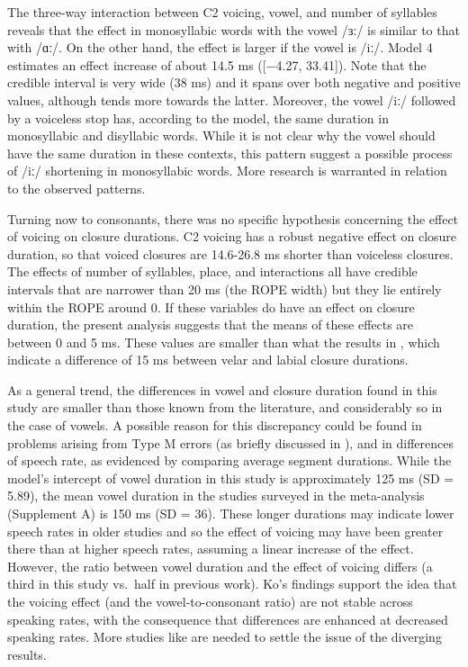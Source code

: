 \documentclass[
  12pt,
  a4paper,
]{article}
\begin{document}
The three-way interaction between C2 voicing, vowel, and number of
syllables reveals that the effect in monosyllabic words with the vowel
/ɜː/ is similar to that with /ɑː/. On the other hand, the effect is
larger if the vowel is /iː/. Model 4 estimates an effect increase of
about 14.5 ms ({[}−4.27, 33.41{]}). Note that the credible interval is
very wide (38 ms) and it spans over both negative and positive values,
although tends more towards the latter. Moreover, the vowel /iː/
followed by a voiceless stop has, according to the model, the same
duration in monosyllabic and disyllabic words. While it is not clear why
the vowel should have the same duration in these contexts, this pattern
suggest a possible process of /iː/ shortening in monosyllabic words.
More research is warranted in relation to the observed patterns.

Turning now to consonants, there was no specific hypothesis concerning
the effect of voicing on closure durations. C2 voicing has a robust
negative effect on closure duration, so that voiced closures are
14.6-26.8 ms shorter than voiceless closures. The effects of number of
syllables, place, and interactions all have credible intervals that are
narrower than 20 ms (the ROPE width) but they lie entirely within the
ROPE around 0. If these variables do have an effect on closure duration,
the present analysis suggests that the means of these effects are
between 0 and 5 ms. These values are smaller than what the results in
\citet{sharf1962}, which indicate a difference of 15 ms between velar
and labial closure durations.

As a general trend, the differences in vowel and closure duration found
in this study are smaller than those known from the literature, and
considerably so in the case of vowels. A possible reason for this
discrepancy could be found in problems arising from Type M errors (as
briefly discussed in ), and in differences of speech rate,
as evidenced by comparing average segment durations. While the model's
intercept of vowel duration in this study is approximately 125 ms (SD =
5.89), the mean vowel duration in the studies surveyed in the
meta-analysis (Supplement A) is 150 ms (SD = 36). These longer durations
may indicate lower speech rates in older studies and so the effect of
voicing may have been greater there than at higher speech rates,
assuming a linear increase of the effect. However, the ratio between
vowel duration and the effect of voicing differs (a third in this study
vs.~half in previous work). Ko's findings \citeyear{ko2018} support the
idea that the voicing effect (and the vowel-to-consonant ratio) are not
stable across speaking rates, with the consequence that differences are
enhanced at decreased speaking rates. More studies like \citet{ko2018}
are needed to settle the issue of the diverging results.
\end{document}
